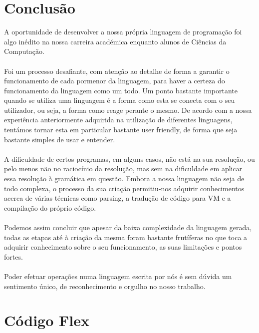 \documentclass[11pt,a4paper]{report}%
\begin{document}
\chapter{Conclusão} \label{concl}
A oportunidade de desenvolver a nossa própria linguagem de programação foi algo inédito na nossa carreira académica enquanto alunos de Ciências da Computação.
\\
\\
Foi um processo desafiante, com atenção ao detalhe de forma a garantir o funcionamento de cada pormenor da linguagem, para haver a certeza do funcionamento da linguagem como um todo.
Um ponto bastante importante quando se utiliza uma linguagem é a forma como esta se conecta com o seu utilizador, ou seja, a forma como reage perante o mesmo. De acordo com a nossa experiência anteriormente adquirida na utilização de diferentes linguagens, tentámos tornar esta em particular bastante user friendly, de forma que seja bastante simples de usar e entender. 
\\
\\
A dificuldade de certos programas, em alguns casos, não está na sua resolução, ou pelo menos não no raciocínio da resolução, mas sem na dificuldade em aplicar essa resolução à gramática em questão.
Embora a nossa linguagem não seja de todo complexa, o processo da sua criação permitiu-nos adquirir conhecimentos acerca de várias técnicas como parsing, a tradução de código para VM e a compilação do próprio código.
\\
\\
Podemos assim concluir que apesar da baixa complexidade da linguagem gerada, todas as etapas até à criação da mesma foram bastante frutíferas no que toca a adquirir conhecimento sobre o seu funcionamento, as suas limitações e pontos fortes.
\\
\\
Poder efetuar operações numa linguagem escrita por nós é sem dúvida um sentimento único, de reconhecimento e orgulho no nosso trabalho.


\appendix %

\chapter{Código Flex}
\end{document}
